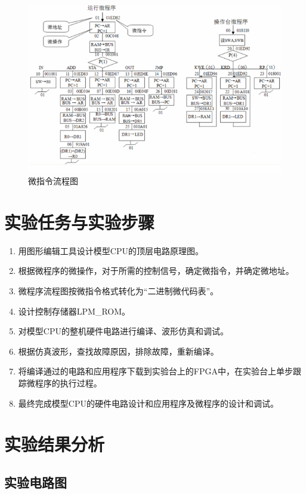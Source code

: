 \begin{figure}[H]
\centering
\includegraphics[width=\textwidth]{images/prin6_4.png}
\caption{微指令流程图}
\label{fig:prin6_4}
\end{figure}

\section{实验任务与实验步骤}

\begin{enumerate}
    \item 用图形编辑工具设计模型CPU的顶层电路原理图。
    \item 根据微程序的微操作，对于所需的控制信号，确定微指令，并确定微地址。
    \item 微程序流程图按微指令格式转化为“二进制微代码表”。
    \item 设计控制存储器LPM\_ROM。
    \item 对模型CPU的整机硬件电路进行编译、波形仿真和调试。
    \item 根据仿真波形，查找故障原因，排除故障，重新编译。
    \item 将编译通过的电路和应用程序下载到实验台上的FPGA中，在实验台上单步跟踪微程序的执行过程。
    \item 最终完成模型CPU的硬件电路设计和应用程序及微程序的设计和调试。 
\end{enumerate}


\section{实验结果分析}

\subsection{实验电路图}

